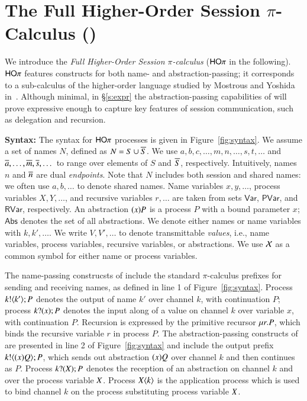 \section{The Full Higher-Order Session $\pi$-Calculus (\HOp)}

We introduce the {\em Full Higher-Order Session $\pi$-calculus}
($\mathsf{HO}\pi$ in the following).
$\mathsf{HO}\pi$ features constructs for both name- and abstraction-passing;
it corresponds to a sub-calculus 
of the higher-order language studied by Mostrous and Yoshida in~\cite{tlca07}.
Although minimal, in \S\ref{s:expr}
the abstraction-passing capabilities of \HOp will prove 
expressive enough to capture key features of session communication, 
such as delegation and recursion.

{\bf Syntax:}
The syntax for $\mathsf{HO}\pi$ processes is given in Figure~\ref{fig:syntax}.
We assume a set of names $N$, defined as $N = S \cup \overline{S}$.
We use $a,b,c, \dots, m, n, \dots, s, t, \dots$ 
and $\overline{a}, \dots, \overline{m}, \overline{s}, \dots$
to range over elements of $S$ and $\overline{S}$, respectively.
Intuitively, names $n$ and $\overline{n}$ are dual \emph{endpoints}.
Note that $N$ includes both session and shared names:
we often use  $a,b, \dots$ to denote shared names.
Name variables $x, y,  \dots$, 
process variables $X, Y,  \dots$,
and recursive variables $r, \dots$ 
are taken from sets $\mathsf{Var}$, $\mathsf{PVar}$, and $\mathsf{RVar}$, respectively. 
An abstraction $(x)P$ is a process $P$ with a bound parameter $x$;
$\mathsf{Abs}$ denotes the set of all abstractions.
We denote either names or name variables with $k, k', \dots$.
We write $V, V', \ldots$ to denote 
transmittable \emph{values}, i.e., 
name variables, process variables, recursive variables, or abstractions.
We use $\mathcal{X}$ as a common symbol for either name or
process variables.

The name-passing construcsts of \HOp include the
standard $\pi$-calculus prefixes for sending and receiving names,
as defined in line 1 of Figure~\ref{fig:syntax}.
Process $k ! \langle k' \rangle ; P$ denotes the output of name $k'$ over channel $k$,
with continuation $P$;
process $k ? (x) ; P$ denotes the input along  of a value
on channel $k$ over variable $x$, with continuation $P$. 
Recursion is expressed by the primitive recursor $\mu r. P$,
which binds the recursive variable $r$ in process $P$.
The abstraction-passing constructs of \HOp are presented in line
2 of Figure~\ref{fig:syntax} and include 
the output prefix $k ! \langle (x)Q \rangle ; P$, which 
sends out abstraction $(x)Q$ over channel $k$ and then continues as $P$. 
Process $k ? (X) ; P$ denotes the reception of an abstraction
on channel $k$ and over the process variable $X$.
Process $X\langle k \rangle$ is the application
process which is used to bind channel $k$ on the process
substituting process variable $X$.

